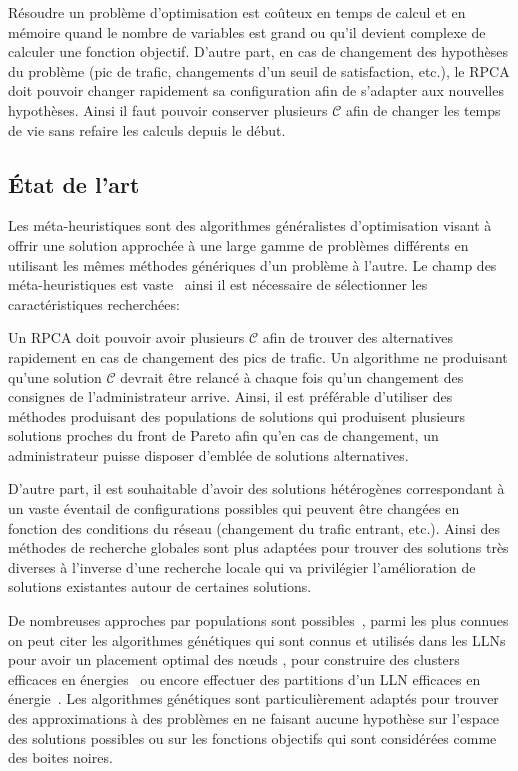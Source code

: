 Résoudre un problème d'optimisation est coûteux en temps de calcul et en mémoire quand le nombre de variables est grand ou qu'il devient complexe de calculer une fonction objectif.
D'autre part, en cas de changement des hypothèses du problème (pic de trafic, changements d'un seuil de satisfaction, etc.), le \ac{RPCA} doit pouvoir changer rapidement sa configuration afin de s'adapter aux nouvelles hypothèses.
Ainsi il faut pouvoir conserver plusieurs $\mathcal{C}$ afin de changer les temps de vie sans refaire les calculs depuis le début.

\subsection{État de l'art}

Les méta-heuristiques sont des algorithmes généralistes d'optimisation visant à offrir une solution approchée à une large gamme de problèmes différents en utilisant les mêmes méthodes génériques d'un problème à l'autre.
Le champ des méta-heuristiques est vaste~\cite{sorensen2015metaheuristics,Luke2013Metaheuristics} ainsi il est nécessaire de sélectionner les caractéristiques recherchées:

Un \ac{RPCA} doit pouvoir avoir plusieurs $\mathcal{C}$ afin de trouver des alternatives rapidement en cas de changement des pics de trafic.
Un algorithme ne produisant qu'une solution $\mathcal{C}$ devrait être relancé à chaque fois qu'un changement des consignes de l'administrateur arrive.
Ainsi, il est préférable d'utiliser des méthodes produisant des populations de solutions qui produisent plusieurs solutions proches du front de Pareto afin qu'en cas de changement, un administrateur puisse disposer d'emblée de solutions alternatives.

D'autre part, il est souhaitable d'avoir des solutions hétérogènes correspondant à un vaste éventail de configurations possibles qui peuvent être changées en fonction des conditions du réseau (changement du trafic entrant, etc.).
Ainsi des méthodes de recherche globales sont plus adaptées pour trouver des solutions très diverses à l'inverse d'une recherche locale qui va privilégier l'amélioration de solutions existantes autour de certaines solutions.

De nombreuses approches par populations sont possibles~\cite{talbi2009metaheuristics}, parmi les plus connues on peut citer les algorithmes génétiques qui sont connus et utilisés dans les \ac{LLN}s pour avoir un placement optimal des nœuds \cite{ferentinos2007adaptive, jourdan2004multi}, pour construire des clusters efficaces en énergies~\cite{hussain2007genetic,abbasi2007survey} ou encore effectuer des partitions d'un \ac{LLN} efficaces en énergie~\cite{lai2007effective}.
Les algorithmes génétiques sont particulièrement adaptés pour trouver des approximations à des problèmes en ne faisant aucune hypothèse sur l'espace des solutions possibles ou sur les fonctions objectifs qui sont considérées comme des boites noires.


